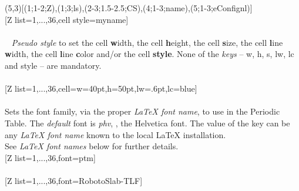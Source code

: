 (5,3)[(1;1-2;Z),(1;3;ls),(2-3;1.5-2.5;CS),(4;1-3;name),(5;1-3;eConfignl)]%
\\ [-4pt][Z list={1,...,36},cell style=myname]%
\\ [10pt]\makebox[\linewidth][c]{\scalebox{.6}{\pgfPT[Z list={1,...,36},cell style=myname]}}%
\\ [5pt]\pgfPTendoption%
\newpage\vspace{-34pt}\ %
\label{style_cell}%
%
{\textit{Pseudo style} to set the cell \textbf{w}idth, the cell \textbf{h}eight, the cell \textbf{s}ize, the cell \textbf{l}ine \textbf{w}idth, the cell \textbf{l}ine \textbf{c}olor and/or the cell \textbf{style}. None of the \textit{keys} -- w, h, s, lw, lc and style -- are mandatory.
\\ [3pt]%
}%
\\ [5pt][Z list={1,...,36},cell={w=40pt,h=50pt,lw=.6pt,lc=blue}]%
\\ [10pt]\makebox[\linewidth][c]{\scalebox{.6}{\pgfPT[Z list={1,...,36},cell={w=40pt,h=50pt,lw=.6pt,lc=blue}]}}%
\\ [5pt]\pgfPTendstyle%
\label{option_font}%
%
{Sets the font family, via the proper \textit{\textrm{\LaTeX} font name}, to use in the Periodic Table. The \textit{default} font is \textit{phv}, \ie, the Helvetica font.
The value of the  key can be any \textit{\textrm{\LaTeX} font name} known to the local \textrm{\LaTeX} installation.
\\ \hfill\scriptsize See \textit{\textrm{\LaTeX} font names} below for further details.}%
\\ [5pt][Z list={1,...,36},font=ptm]%
\\ [10pt]\makebox[\linewidth][c]{\scalebox{.6}{\pgfPT[Z list={1,...,36},font=ptm]}}%
\\ [10pt][Z list={1,...,36},font=RobotoSlab-TLF]%
\\ [10pt]\makebox[\linewidth][c]{\scalebox{.6}{\pgfPT[Z list={1,...,36},font=RobotoSlab-TLF]}}%
